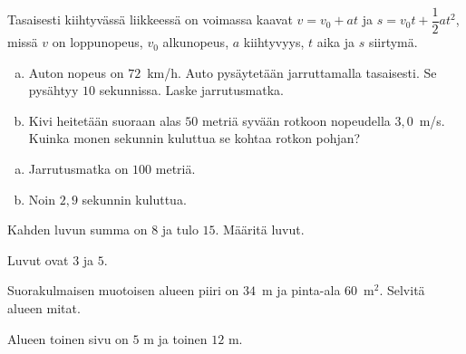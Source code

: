 \begin{tehtava}
    Tasaisesti kiihtyvässä liikkeessä on voimassa kaavat $v = v_0 + at$ ja $s = v_0t + \dfrac{1}{2}at^2$, missä $v$ on loppunopeus, $v_0$ alkunopeus, $a$ kiihtyvyys, $t$ aika ja $s$ siirtymä.
		\begin{enumerate}[a)]
            \item Auton nopeus on $72$~km/h. Auto pysäytetään jarruttamalla tasaisesti. Se pysähtyy $10$ sekunnissa. Laske jarrutusmatka.
            \item Kivi heitetään suoraan alas $50$ metriä syvään rotkoon nopeudella $3,0$~m/s. Kuinka monen sekunnin kuluttua se kohtaa rotkon pohjan?
        \end{enumerate}
    \begin{vastaus}
        \begin{enumerate}[a)]
            \item Jarrutusmatka on $100$ metriä.
            \item Noin $2,9$ sekunnin kuluttua.
        \end{enumerate}
    \end{vastaus}
\end{tehtava}

\begin{tehtava}
    Kahden luvun summa on $8$ ja tulo $15$. Määritä luvut.
    \begin{vastaus}
		Luvut ovat $3$ ja $5$.
    \end{vastaus}
\end{tehtava}

\begin{tehtava}
    Suorakulmaisen muotoisen alueen piiri on $34$~m ja pinta-ala $60$~m$^2$. Selvitä alueen mitat.
    \begin{vastaus}
		Alueen toinen sivu on $5$ m ja toinen $12$ m.
    \end{vastaus}
\end{tehtava}

